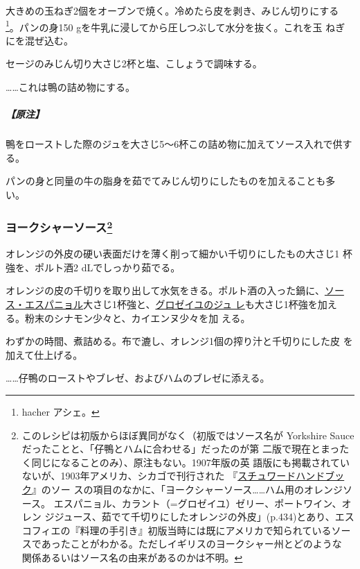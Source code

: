 \begin{recette}
大きめの玉ねぎ2個をオーブンで焼く。冷めたら皮を剥き、みじん切りにする
\footnote{hacher アシェ。}。パンの身150
gを牛乳に浸してから圧しつぶして水分を抜く。これを玉 ねぎにを混ぜ込む。

セージのみじん切り大さじ2杯と塩、こしょうで調味する。

\ldots{}\ldots{}これは鴨の詰め物にする。

\hypertarget{nota-sage-and-onions-sauce}{%
\subparagraph{【原注】}\label{nota-sage-and-onions-sauce}}

鴨をローストした際のジュを大さじ5〜6杯この詰め物に加えてソース入れで供する。

パンの身と同量の牛の脂身を茹でてみじん切りにしたものを加えることも多い。

\maeaki

\hypertarget{sauce-yorkshire}{%
\subsubsection[ヨークシャーソース]{\texorpdfstring{ヨークシャーソース\footnote{このレシピは初版からほぼ異同がなく（初版ではソース名が
  Yorkshire Sauceだったことと、「仔鴨とハムに合わせる」だったのが第
  二版で現在とまったく同じになることのみ）、原注もない。1907年版の英
  語版にも掲載されていないが、1903年アメリカ、シカゴで刊行された
  『\href{https://archive.org/details/stewardshandbook00whitiala}{スチュワードハンドブッ
  ク}』のソー
  スの項目のなかに、「ヨークシャーソース\ldots{}\ldots{}ハム用のオレンジソース。
  エスパニョル、カラント（=グロゼイユ）ゼリー、ポートワイン、オレン
  ジジュース、茹でて千切りにしたオレンジの外皮」(p.434)とあり、エス
  コフィエの『料理の手引き』初版当時には既にアメリカで知られているソー
  スであったことがわかる。ただしイギリスのヨークシャー州とどのような
  関係あるいはソース名の由来があるのかは不明。}}{ヨークシャーソース}}\label{sauce-yorkshire}}



オレンジの外皮の硬い表面だけを薄く削って細かい千切りにしたもの大さじ1
杯強を、ポルト酒2 dLでしっかり茹でる。

オレンジの皮の千切りを取り出して水気をきる。ポルト酒の入った鍋に、\protect\hyperlink{sauce-espagnole}{ソー
ス・エスパニョル}大さじ1杯強と、\protect\hyperlink{}{グロゼイユのジュ
レ}も大さじ1杯強を加える。粉末のシナモン少々と、カイエンヌ少々を加
える。

わずかの時間、煮詰める。布で漉し、オレンジ1個の搾り汁と千切りにした皮
を加えて仕上げる。

\ldots{}\ldots{}仔鴨のローストやブレゼ、およびハムのブレゼに添える。
\end{recette}